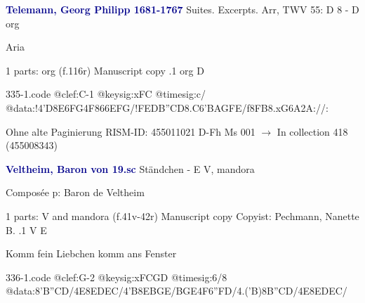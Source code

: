 \documentclass[twocolumn]{book}
\begin{document}
\newline \par \vspace{7pt} \textcolor{darkblue}{\textbf{Telemann, Georg Philipp  1681-1767}}
\newline Suites. Excerpts. Arr, TWV 55: D 8 - D
\newline org
\newline \begin{itshape}[f.116r, heading:] Aria\end{itshape} 
\newline \textcolor{darkblue}{}  1 parts: org  (f.116r)
\newline Manuscript copy
.1  org  D  
\begin{filecontents*}{335-1.code}
@clef:C-1
@keysig:xFC
@timesig:c/
@data:!4'D{8E6FG}4F{866EFG}/!{FED}{B''CD}{8.C6'B}{AGFE}/f{8FB}{8.xG6A}2A://:
\end{filecontents*}
\newline
%

\newline Ohne alte Paginierung
\newline RISM-ID: 455011021
\newline D-Fh  Ms 001
\newline $\rightarrow$ In collection 418 (455008343)
      
\newline \par \vspace{7pt} \textcolor{darkblue}{\textbf{Veltheim, Baron von  19.sc}}
\newline Ständchen - E
\newline V, mandora
\newline \begin{itshape}[heading, f.41v:] Composée p: Baron de Veltheim\end{itshape} 
\newline \textcolor{darkblue}{}  1 parts: V and mandora  (f.41v-42r)
\newline Manuscript copy
\newline Copyist: Pechmann, Nanette B.
.1  V  E
\newline \begin{footnotesize} Komm fein Liebchen komm ans Fenster \end{footnotesize}  
\begin{filecontents*}{336-1.code}
@clef:G-2
@keysig:xFCGD
@timesig:6/8
@data:{8'B''C}D/4E8E{DE}C/4'B8E{BG}E/{BG}E4F{6''FD}/4.('B){8B''C}D/4E8E{DE}C/
\end{filecontents*}
\newline
%
\end{document}
